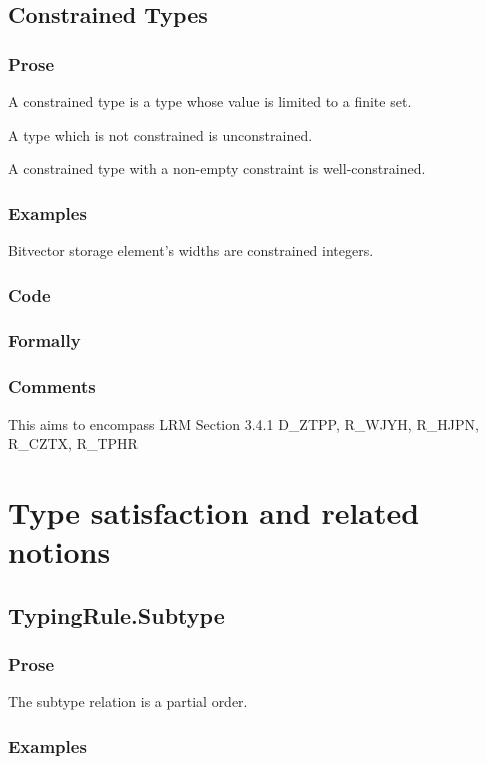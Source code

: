 \documentclass{book}
\begin{document}
\section{Constrained Types}

\subsection{Prose}
  A constrained type is a type whose value is limited to a finite
  set. 

  A type which is not constrained is unconstrained.

  A constrained type with a non-empty constraint is well-constrained.

\subsection{Examples}
  Bitvector storage element’s widths are constrained integers.  

  \subsection{Code}

  \subsection{Formally}

\subsection{Comments}
  This aims to encompass LRM Section 3.4.1 D\_ZTPP, R\_WJYH, R\_HJPN, R\_CZTX, R\_TPHR

\chapter{Type satisfaction and related notions}

\section{TypingRule.Subtype} 

\subsection{Prose}
  The subtype relation is a partial order.

\subsection{Examples}
\end{document}

